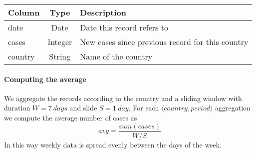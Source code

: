 \begin{center}
    \begin{tabu}{l c X}
        \toprule
        \rowfont{\sffamily\bfseries}
        Column  & Type    & Description                                      \\
        \midrule
        date    & Date    & Date this record refers to                       \\
        cases   & Integer & New cases since previous record for this country \\
        country & String  & Name of the country                              \\
        \bottomrule
    \end{tabu}
\end{center}

\pagebreak

\paragraph{Computing the average}
We aggregate the records according to the country and a sliding window with duration $W = \SI{7}{days}$ and slide $S = \SI{1}{day}$.
For each $\langle country, period\rangle$ aggregation we compute the average number of cases as
\[
    avg = \frac{sum(cases)}{W / S}
\]
In this way weekly data is spread evenly between the days of the week.

